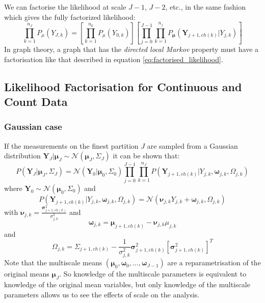 \documentclass[a4paper,12pt]{article}
\theoremstyle{definition}
\begin{document}
We can factorise the likelihood at scale $J-1$, $J-2$, etc., in the same fashion which gives the fully factorized likelihood:
\begin{equation}\label{eq:factorised_likelihood}
  \prod_{k=1}^{n_J} P_{\mu}(Y_{J,k}) =  \left[ \prod_{k=1}^{n_0} P_{\mu}(Y_{0,k}) \right] \left[ \prod_{j=0}^{J-1} \prod_{k=1}^{n_j} P_{\boldsymbol{\mu}}(\mathbf{Y}_{j+1, ch(k)} | Y_{j,k})  \right]
\end{equation}
In graph theory, a graph that has the \textit{directed local Markov} property must have a factorisation like that described in equation \ref{eq:factorised_likelihood}.

\subsection{Likelihood Factorisation for Continuous and Count Data}

\subsubsection{Gaussian case}
If the measurements on the finest partition $J$ are sampled from a Gaussian distribution $\mathbf{Y}_{J} | \boldsymbol{\mu}_J \sim \mathcal{N}(\boldsymbol{\mu}_J, \Sigma_J)$ it can be shown that:
\begin{equation}
  P(\mathbf{Y}_J | \boldsymbol{\mu}_J, \Sigma_J) = \mathcal{N}(\mathbf{Y}_0 | \boldsymbol{\mu}_0, \Sigma_0) \prod_{j=0}^{J-1}\prod_{k=1}^{n_J} P(\mathbf{Y}_{j+1, ch(k)} | Y_{j,k}, \boldsymbol{\omega}_{j,k}, \Omega_{j,k})
\end{equation}
where $\mathbf{Y}_0 \sim \mathcal{N}(\boldsymbol{\mu}_0, \Sigma_0)$ and
\begin{equation}\label{eq:gaussian_child}
  P(\mathbf{Y}_{j+1, ck(k)} | Y_{j,k}, \boldsymbol{\omega}_{j,k}, \Omega_{j,k}) = \mathcal{N}(\boldsymbol{\nu}_{j,k}Y_{j,k} + \boldsymbol{\omega}_{j,k}, \Omega_{j,k})
\end{equation}
with $\boldsymbol{\nu}_{j,k} = \frac{\boldsymbol{\sigma}^2_{j+1,ch(k)}}{\sigma^2_{j,k}}$ and
\begin{equation}\label{eq:gaussian_omega}
  \boldsymbol{\omega}_{j,k} = \boldsymbol{\mu}_{j+1, ch(k)} - \boldsymbol{\nu}_{j,k}\mu_{j,k}
\end{equation}
and
\begin{equation}\label{eq:gaussian_big_omega}
  \Omega_{j,k} = \Sigma_{j+1, ch(k)} - \frac{1}{\sigma^2_{j,k}} \boldsymbol{\sigma}^2_{j+1, ch(k)}\left[ \boldsymbol{\sigma}^2_{j+1, ch(k)}  \right]^T
\end{equation}
Note that the multiscale means $(\boldsymbol{\mu}_0, \boldsymbol{\omega}_0, \dots, \boldsymbol{\omega}_{J-1})$ are a reparametrisation of the original means $\boldsymbol{\mu}_J$. So knowledge of the multiscale parameters is equivalent to knowledge of the original mean variables, but only knowledge of the multiscale parameters allows us to see the effects of scale on the analysis.
\end{document}
